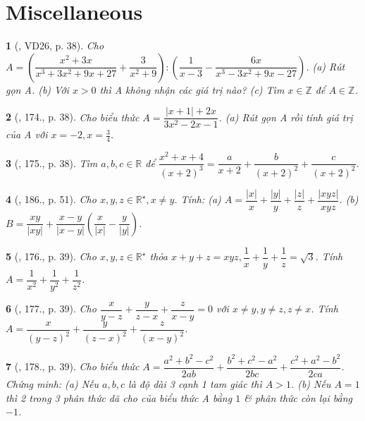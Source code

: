 \documentclass{article}
\newtheorem{baitoan}{}
\begin{document}
\section{Miscellaneous}

\begin{baitoan}[\cite{Tuyen_Toan_8}, VD26, p. 38]
	Cho $A = \left(\dfrac{x^2 + 3x}{x^3 + 3x^2 + 9x + 27} + \dfrac{3}{x^2 + 9}\right):\left(\dfrac{1}{x - 3} - \dfrac{6x}{x^3 - 3x^2 + 9x - 27}\right)$. (a) Rút gọn A. (b) Với $x > 0$ thì A không nhận các giá trị nào? (c) Tìm $x\in\mathbb{Z}$ để $A\in\mathbb{Z}$.
\end{baitoan}

\begin{baitoan}[\cite{Tuyen_Toan_8}, 174., p. 38]
	Cho biểu thức $A = \dfrac{|x + 1| + 2x}{3x^2 - 2x - 1}$. (a) Rút gọn A rồi tính giá trị của A với $x = -2,x = \frac{3}{4}$.
\end{baitoan}

\begin{baitoan}[\cite{Tuyen_Toan_8}, 175., p. 38]
	Tìm $a,b,c\in\mathbb{R}$ để $\dfrac{x^2 + x + 4}{(x + 2)^3} = \dfrac{a}{x + 2} + \dfrac{b}{(x + 2)^2} + \dfrac{c}{(x + 2)^2}$.
\end{baitoan}

\begin{baitoan}[\cite{Tuyen_Toan_8_old}, 186., p. 51]
	Cho $x,y,z\in\mathbb{R}^\star,x\ne y$. Tính: (a) $A = \dfrac{|x|}{x} + \dfrac{|y|}{y} + \dfrac{|z|}{z} + \dfrac{|xyz|}{xyz}$. (b) $B = \dfrac{xy}{|xy|} + \dfrac{x - y}{|x - y|}\left(\dfrac{x}{|x|} - \dfrac{y}{|y|}\right)$.
\end{baitoan}

\begin{baitoan}[\cite{Tuyen_Toan_8}, 176., p. 39]
	Cho $x,y,z\in\mathbb{R}^\star$ thỏa $x + y + z = xyz,\dfrac{1}{x} + \dfrac{1}{y} + \dfrac{1}{z} = \sqrt{3}$. Tính $A = \dfrac{1}{x^2} + \dfrac{1}{y^2} + \dfrac{1}{z^2}$.
\end{baitoan}

\begin{baitoan}[\cite{Tuyen_Toan_8}, 177., p. 39]
	Cho $\dfrac{x}{y - z} + \dfrac{y}{z - x} + \dfrac{z}{x - y} = 0$ với $x\ne y,y\ne z,z\ne x$. Tính $A = \dfrac{x}{(y - z)^2} + \dfrac{y}{(z - x)^2} + \dfrac{z}{(x - y)^2}$.
\end{baitoan}

\begin{baitoan}[\cite{Tuyen_Toan_8}, 178., p. 39]
	Cho biểu thức $A = \dfrac{a^2 + b^2 - c^2}{2ab} + \dfrac{b^2 + c^2 - a^2}{2bc} + \dfrac{c^2 + a^2 - b^2}{2ca}$. Chứng minh: (a) Nếu $a,b,c$ là độ dài 3 cạnh 1 tam giác thì $A > 1$. (b) Nếu $A = 1$ thì 2 trong 3 phân thức dã cho của biểu thức A bằng $1$ \& phân thức còn lại bằng $-1$.
\end{baitoan}
\end{document}
